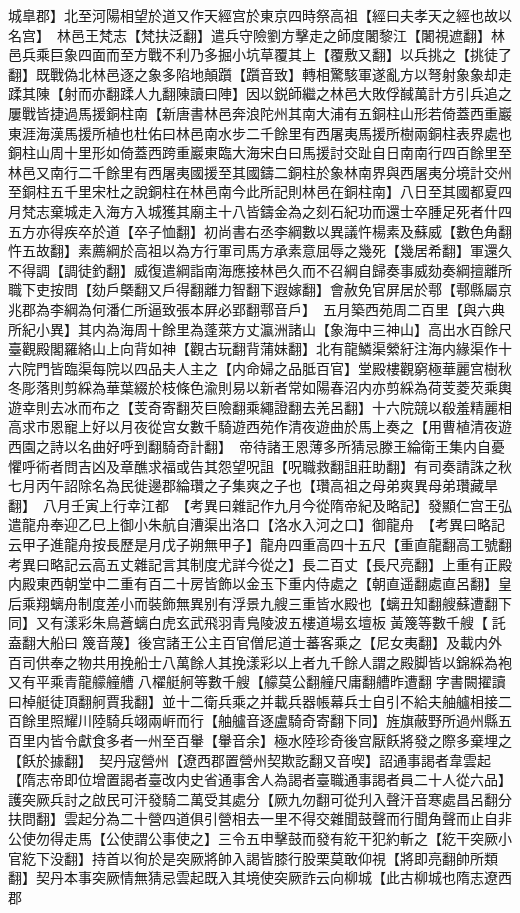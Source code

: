 城臯郡】北至河陽相望於道又作天經宫於東京四時祭高祖【經曰夫孝天之經也故以名宫】　林邑王梵志【梵扶泛翻】遣兵守險劉方擊走之師度闍黎江【闍視遮翻】林邑兵乘巨象四面而至方戰不利乃多掘小坑草覆其上【覆敷又翻】以兵挑之【挑徒了翻】既戰偽北林邑逐之象多陷地顛躓【躓音致】轉相驚駭軍遂亂方以弩射象象却走蹂其陳【射而亦翻蹂人九翻陳讀曰陣】因以鋭師繼之林邑大敗俘馘萬計方引兵追之屢戰皆捷過馬援銅柱南【新唐書林邑奔浪陀州其南大浦有五銅柱山形若倚蓋西重巖東涯海漢馬援所植也杜佑曰林邑南水步二千餘里有西屠夷馬援所樹兩銅柱表界處也銅柱山周十里形如倚蓋西跨重巖東臨大海宋白曰馬援討交趾自日南南行四百餘里至林邑又南行二千餘里有西屠夷國援至其國鑄二銅柱於象林南界與西屠夷分境計交州至銅柱五千里宋杜之說銅柱在林邑南今此所記則林邑在銅柱南】八日至其國都夏四月梵志棄城走入海方入城獲其廟主十八皆鑄金為之刻石紀功而還士卒腫足死者什四五方亦得疾卒於道【卒子恤翻】初尚書右丞李綱數以異議忤楊素及蘇威【數色角翻忤五故翻】素薦綱於高祖以為方行軍司馬方承素意屈辱之幾死【幾居希翻】軍還久不得調【調徒釣翻】威復遣綱詣南海應接林邑久而不召綱自歸奏事威劾奏綱擅離所職下吏按問【劾戶槩翻又戶得翻離力智翻下遐嫁翻】會赦免官屏居於鄠【鄠縣屬京兆郡為李綱為何潘仁所逼致張本屛必郢翻鄠音戶】　五月築西苑周二百里【與六典所紀小異】其内為海周十餘里為蓬萊方丈瀛洲諸山【象海中三神山】高出水百餘尺臺觀殿閣羅絡山上向背如神【觀古玩翻背蒲妹翻】北有龍鱗渠縈紆注海内緣渠作十六院門皆臨渠每院以四品夫人主之【内命婦之品胝百官】堂殿樓觀窮極華麗宫樹秋冬彫落則剪綵為華葉綴於枝條色渝則易以新者常如陽春沼内亦剪綵為荷芰菱芡乘輿遊幸則去冰而布之【芰奇寄翻芡巨險翻乘繩證翻去羌呂翻】十六院競以殽羞精麗相高求市恩寵上好以月夜從宫女數千騎遊西苑作清夜遊曲於馬上奏之【用曹植清夜遊西園之詩以名曲好呼到翻騎奇計翻】　帝待諸王恩薄多所猜忌滕王綸衛王集内自憂懼呼術者問吉凶及章醮求福或告其怨望呪詛【呪職救翻詛莊助翻】有司奏請誅之秋七月丙午詔除名為民徙邊郡綸瓚之子集爽之子也【瓚高祖之母弟爽異母弟瓚藏旱翻】　八月壬寅上行幸江都　【考異曰雜記作九月今從隋帝紀及略記】發顯仁宫王弘遣龍舟奉迎乙巳上御小朱航自漕渠出洛口【洛水入河之口】御龍舟　【考異曰略記云甲子進龍舟按長歷是月戊子朔無甲子】龍舟四重高四十五尺【重直龍翻高工號翻　考異曰略記云高五丈雜記言其制度尤詳今從之】長二百丈【長尺亮翻】上重有正殿内殿東西朝堂中二重有百二十房皆飾以金玉下重内侍處之【朝直遥翻處直呂翻】皇后乘翔螭舟制度差小而裝飾無異别有浮景九艘三重皆水殿也【螭丑知翻艘蘇遭翻下同】又有漾彩朱鳥蒼螭白虎玄武飛羽青鳬陵波五樓道場玄壇板黃篾等數千艘【託盍翻大船曰篾音蔑】後宫諸王公主百官僧尼道士蕃客乘之【尼女夷翻】及載内外百司供奉之物共用挽船士八萬餘人其挽漾彩以上者九千餘人謂之殿脚皆以錦綵為袍又有平乘青龍艨艟艚八櫂艇舸等數千艘【艨莫公翻艟尺庸翻艚昨遭翻字書闕擢讀曰棹艇徒頂翻舸賈我翻】並十二衛兵乘之并載兵器帳幕兵士自引不給夫舳艫相接二百餘里照耀川陸騎兵翊兩㟁而行【舳艫音逐盧騎奇寄翻下同】旌旗蔽野所過州縣五百里内皆令獻食多者一州至百轝【轝音余】極水陸珍奇後宫厭飫將發之際多棄埋之【飫於據翻】　契丹寇營州【遼西郡置營州契欺訖翻又音喫】詔通事謁者韋雲起【隋志帝即位增置謁者臺改内史省通事舍人為謁者臺職通事謁者員二十人從六品】護突厥兵討之啟民可汗發騎二萬受其處分【厥九勿翻可從刋入聲汗音寒處昌呂翻分扶問翻】雲起分為二十營四道俱引營相去一里不得交雜聞鼓聲而行聞角聲而止自非公使勿得走馬【公使謂公事使之】三令五申擊鼓而發有紇干犯約斬之【紇干突厥小官紇下没翻】持首以徇於是突厥將帥入謁皆膝行股栗莫敢仰視【將即亮翻帥所類翻】契丹本事突厥情無猜忌雲起既入其境使突厥詐云向柳城【此古柳城也隋志遼西郡